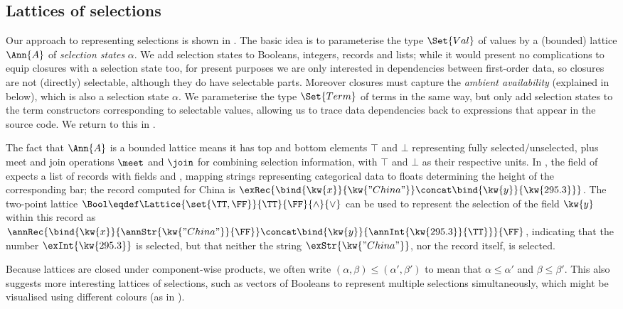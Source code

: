 \subsection{Lattices of selections}
\label{sec:data-dependencies:lattices-of-selections}

Our approach to representing selections is shown in . The basic idea is to parameterise the type $\Set{Val}$ of values by a (bounded) lattice $\Ann{A}$ of \emph{selection states} $\alpha$. We add selection states to Booleans, integers, records and lists; while it would present no complications to equip closures with a selection state too, for present purposes we are only interested in dependencies between first-order data, so closures are not (directly) selectable, although they do have selectable parts. Moreover closures must capture the \emph{ambient availability} (explained in  below), which is also a selection state $\alpha$. We parameterise the type $\Set{Term}$ of terms in the same way, but only add selection states to the term constructors corresponding to selectable values, allowing us to trace data dependencies back to expressions that appear in the source code. We return to this in .



\vspace{-3mm}
The fact that $\Ann{A}$ is a bounded lattice means it has top and bottom elements $\top$ and $\bot$ representing fully selected/unselected, plus meet and join operations $\meet$ and $\join$ for combining selection information, with $\top$ and $\bot$ as their respective units. In , the  field of  expects a list of records with fields  and , mapping strings representing categorical data to floats determining the height of the corresponding bar; the record computed for China is $\exRec{\bind{\kw{x}}{\kw{"China"}} \concat \bind{\kw{y}}{\kw{295.3}}}$. The two-point lattice $\Bool \eqdef \Lattice{\set{\TT,\FF}}{\TT}{\FF}{\wedge}{\vee}$ can be used to represent the selection of the field $\kw{y}$ within this record as $\annRec{\bind{\kw{x}}{\annStr{\kw{"China"}}{\FF}} \concat \bind{\kw{y}}{\annInt{\kw{295.3}}{\TT}}}{\FF}$, indicating that the number $\exInt{\kw{295.3}}$ is selected, but that neither the string $\exStr{\kw{"China"}}$, nor the record itself, is selected.

Because lattices are closed under component-wise products, we often write $(\alpha, \beta) \leq (\alpha', \beta')$ to mean that $\alpha \leq \alpha'$ and $\beta \leq \beta'$. This also suggests more interesting lattices of selections, such as vectors of Booleans to represent multiple selections simultaneously, which might be visualised using different colours (as in ).

